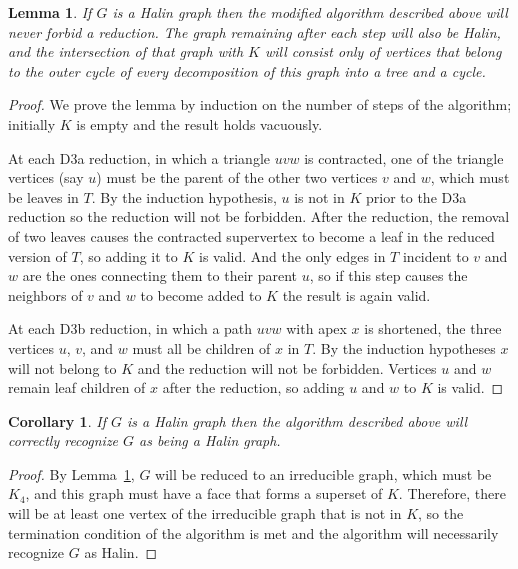 \documentclass{article}
\newtheorem{lemma}{Lemma}
\newtheorem{corollary}{Corollary}
\begin{document}
\begin{lemma}
\label{lem:Halin-subset}
If $G$ is a Halin graph then the
modified algorithm described above will never forbid a reduction. The graph remaining after each step will also be Halin, and the intersection of that graph with $K$ will consist only of vertices that belong to the outer cycle of every decomposition of this graph into a tree and a cycle.
\end{lemma}

\begin{proof}
We prove the lemma by induction on the number of steps of the algorithm; initially $K$ is empty and the result holds vacuously.

At each D3a reduction, in which a triangle $uvw$ is contracted, one of the triangle vertices (say $u$) must be the parent of the other two vertices $v$ and $w$, which must be leaves in $T$. By the induction hypothesis, $u$ is not in $K$ prior to the D3a reduction so the reduction will not be forbidden. After the reduction, the removal of two leaves causes the contracted supervertex to become a leaf in the reduced version of $T$, so adding it to $K$ is valid. And the only edges in $T$ incident to $v$ and $w$ are the ones connecting them to their parent $u$, so if this step causes the neighbors of $v$ and $w$ to become added to $K$ the result is again valid.

At each D3b reduction, in which a path $uvw$ with apex $x$ is shortened, the three vertices $u$, $v$, and $w$ must all be children of $x$ in $T$. By the induction hypotheses $x$ will not belong to $K$ and the reduction will not be forbidden. Vertices $u$ and $w$ remain leaf children of $x$ after the reduction, so adding $u$ and $w$ to $K$ is valid.
\end{proof}

\begin{corollary}
\label{cor:no-false-neg}
If $G$ is a Halin graph then the algorithm described above will correctly recognize $G$ as being a Halin graph.
\end{corollary}

\begin{proof}
By Lemma~\ref{lem:Halin-subset}, $G$ will be reduced to an irreducible graph, which must be $K_4$, and this graph must have a face that forms a superset of $K$.
Therefore, there will be at least one vertex of the irreducible graph that is not in $K$, so the termination condition of the algorithm is met and the algorithm will necessarily recognize $G$ as Halin.
\end{proof}
\end{document}
